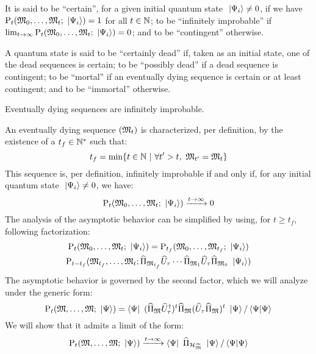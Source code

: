 It is said to be ``certain'', for a given initial quantum state $\ \left|{\Psi_i}\right\rangle \neq 0$, if we have $\mathrm P_t(\mathfrak{M}_0, \dotsc, \mathfrak{M}_t; \ \left|{\Psi_i}\right\rangle) = 1$ for all $t \in \mathbb{N}$; to be ``infinitely improbable'' if $\lim_{t \to \infty} \mathrm P_t(\mathfrak{M}_0, \dotsc, \mathfrak{M}_t; \ \left|{\Psi_i}\right\rangle) = 0$; and to be ``contingent'' otherwise.

A quantum state is said to be ``certainly dead'' if, taken as an initial state, one of the dead sequences is certain; to be ``possibly dead'' if a dead sequence is contingent; to be ``mortal'' if an eventually dying sequence is certain or at least contingent; and to be ``immortal'' otherwise.

 Eventually dying sequences are infinitely improbable.

 An eventually dying sequence $(\mathfrak{M}_t)$ is characterized, per definition, by the existence of a $t_f \in \mathbb{N}^*$ such that:
\begin{equation*}
t_f = \min \{ t \in \IN\ |\ \forall t' > t,\ \cms_{t'} = \cms_t \}
\end{equation*}
This sequence is, per definition, infinitely improbable if and only if, for any initial quantum state $\ \left|{\Psi_i}\right\rangle \neq 0$, we have:
\begin{equation*}
\mathrm P_t(\mathfrak{M}_0, \dotsc, \mathfrak{M}_t; \ \left|{\Psi_i}\right\rangle) \xrightarrow{t \to \infty} 0
\end{equation*}
The analysis of the asymptotic behavior can be simplified by using, for $t \geq t_f$, following factorization:
\begin{multline*}
\mathrm P_t(\mathfrak{M}_0, \dotsc, \mathfrak{M}_t; \ \left|{\Psi_i}\right\rangle) = \mathrm P_{t_f}(\mathfrak{M}_0, \dotsc, \mathfrak{M}_{t_f}; \ \left|{\Psi_i}\right\rangle) \\
\mathrm P_{t - t_f}(\mathfrak{M}_{t_f}, \dotsc, \mathfrak{M}_t; \widehat{\Pi}_{\mathfrak{M}_{t_f}} \widehat{U}_\tau \dotsm \widehat{\Pi}_{\mathfrak{M}_1} \widehat{U}_\tau \widehat{\Pi}_{\mathfrak{M}_0} \ \left|{\Psi_i}\right\rangle)
\end{multline*}
The asymptotic behavior is governed by the second factor, which we will analyze under the generic form:
\begin{equation*}
\mathrm P_t(\mathfrak{M}, \dotsc, \mathfrak{M}; \ \left|{\Psi}\right\rangle) = \left\langle{\Psi}\right|\  (\widehat{\Pi}_{\mathfrak{M}} \widehat{U}^{\dagger}_\tau)^t \widehat{\Pi}_{\mathfrak{M}} (\widehat{U}_\tau \widehat{\Pi}_{\mathfrak{M}})^t \ \left|{\Psi}\right\rangle / \left\langle{\Psi}|{\Psi}\right\rangle
\end{equation*}
We will show that it admits a limit of the form:
\begin{equation*}
\mathrm P_t(\mathfrak{M}, \dotsc, \mathfrak{M}; \ \left|{\Psi}\right\rangle) \xrightarrow{t \to \infty} \left\langle{\Psi}\right|\  \widehat{\Pi}_{\mathcal H_{\mathfrak{M}}^\infty} \ \left|{\Psi}\right\rangle / \left\langle{\Psi}|{\Psi}\right\rangle
\end{equation*}
